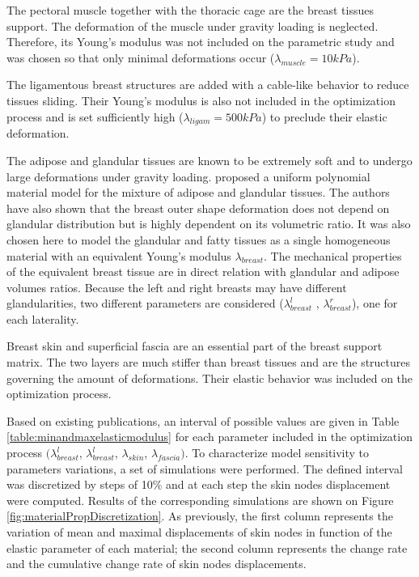 The pectoral muscle together with the thoracic cage are the breast tissues support. The deformation of the muscle under gravity loading is neglected. Therefore, its Young's modulus was not included on the parametric study and was chosen so that only minimal deformations occur ($\lambda_{muscle}=10kPa$).

The ligamentous breast structures are added with a cable-like behavior to reduce tissues sliding. Their Young's modulus is also not included in the optimization process and is set sufficiently high ($\lambda_{ligam}=500kPa$) to preclude their elastic deformation. 

The adipose and glandular tissues are known to be extremely soft and to undergo large deformations under gravity loading.  \cite{calvo_polynomial_2015} proposed a uniform polynomial material model for the mixture of adipose and glandular tissues. The authors have also shown that the breast outer shape deformation does not depend on glandular distribution but is highly dependent on its volumetric ratio. It was also chosen here to model the glandular and fatty tissues as a single homogeneous material with an equivalent Young's modulus $\lambda_{breast }$. The mechanical properties of the equivalent breast tissue are in direct relation with glandular and adipose volumes ratios. Because the left and right breasts may have different glandularities, two different parameters are considered ($\lambda_{breast}^l$ , $\lambda_{breast}^r$), one for each laterality.

Breast skin and superficial fascia are an essential part of the breast support matrix. The two layers are much stiffer than breast tissues and are the structures governing the amount of deformations. Their elastic behavior was included on the optimization process.

 Based on existing publications, an interval of possible values are given in Table \ref{table:minandmaxelasticmodulus} for each parameter included in the optimization process $(\lambda_{breast}^l$, $\lambda_{breast}^l$, $\lambda_{skin}$, $\lambda_{fascia})$. To characterize model sensitivity to parameters variations, a set of simulations were performed. The defined interval was discretized by steps of 10\% and at each step the skin nodes displacement were computed. Results of the corresponding simulations are shown on Figure  \ref{fig:materialPropDiscretization}. As previously, the first column represents the variation of mean and maximal displacements of skin nodes in function of the elastic parameter of each material; the second column represents the change rate and the cumulative change rate of skin nodes displacements.


